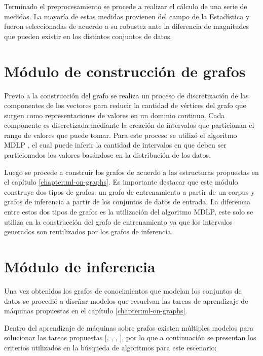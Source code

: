 Terminado el preprocesamiento se procede a realizar el c\'alculo de una serie de medidas. La mayor\'ia
de estas medidas provienen del campo de la Estad\'istica y fueron seleccionadas de acuerdo a su robustez
ante la diferencia de magnitudes que pueden existir en los distintos conjuntos de datos.

\section{M\'odulo de construcci\'on de grafos}

Previo a la construcci\'on del grafo se realiza un proceso
de discretizaci\'on de las componentes de los vectores para reducir
la cantidad de v\'ertices del grafo que surgen como representaciones de valores en un dominio continuo.
Cada componente es discretizada mediante la creaci\'on de intervalos que particionan el
rango de valores que puede tomar. Para este proceso
se utiliz\'o el algoritmo MDLP \cite{fayyad1993multi}, el cual puede
inferir la cantidad de intervalos en que deben ser particionados los valores
bas\'andose en la distribuci\'on de los datos. 

Luego se procede a construir los grafos de acuerdo a las estructuras propuestas en el cap\'itulo \ref{chapter:ml-on-graphs}.
Es importante destacar que este m\'odulo construye dos tipos de grafos: un grafo de entrenamiento a partir de un corpus y
grafos de inferencia a partir de los conjuntos de datos de entrada. La diferencia entre estos dos tipos de grafos es la utilizaci\'on
del algoritmo MDLP, este solo se utiliza en la construcci\'on del grafo de entrenamiento ya
que los intervalos generados son reutilizados por los grafos de inferencia.
\section{M\'odulo de inferencia}

Una vez obtenidos los grafos de conocimientos que modelan los conjuntos de datos se procedi\'o
a dise\~nar modelos que resuelvan las tareas de aprendizaje de m\'aquinas propuestas en el cap\'itulo \ref{chapter:ml-on-graphs}.

Dentro del aprendizaje de m\'aquinas sobre grafos existen m\'ultiples modelos para solucionar las tareas propuestas 
[\cite*{hamilton2017representation}, \cite*{chami2022machine},  \cite*{cai2018comprehensive}, \cite*{nickel2015review}], por lo que a continuaci\'on se presentan
los criterios utilizados en la b\'usqueda de algoritmos para este escenario:

